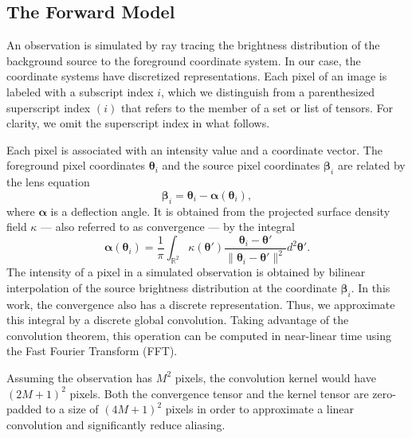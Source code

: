 \subsection{The Forward Model}\label{sec:forward model}

An observation is simulated by ray tracing the brightness distribution 
of the background source to the foreground coordinate system. 
In our case, the coordinate systems have discretized representations.
Each pixel of an image is labeled with a subscript index $i$, which 
we distinguish from a parenthesized superscript index $(i)$ that refers to 
the member of a set or list of tensors. For clarity, we omit 
the superscript index in what follows.

Each pixel is associated 
with an intensity value and a coordinate vector.
The foreground pixel coordinates $\boldsymbol{\theta}_i$ and the source 
pixel coordinates $\boldsymbol{\beta}_i$ are related by
the lens equation
\begin{equation}\label{eq:LensEquation}
        \bm{\beta}_i = \bm{\theta}_i - \bm{\alpha}(\bm{\theta}_i),
\end{equation}
where $\boldsymbol{\alpha}$ is a deflection angle.
It is obtained from the projected surface 
density field $\kappa$ --- also referred to as convergence --- by the integral
\begin{equation}\label{eq:alpha}
        \bm{\alpha}(\boldsymbol{\theta}_i) = 
        \frac{1}{\pi} \int_{\mathbb{R}^2}
        \kappa(\boldsymbol{\theta}') 
        \frac{\boldsymbol{\theta}_i
        - \boldsymbol{\theta}'}{\lVert \boldsymbol{\theta}_i - 
        \boldsymbol{\theta}' \rVert^2}
        d^2\boldsymbol{\theta}'.
\end{equation}
The intensity of a pixel in a simulated observation
is obtained by bilinear interpolation of the 
source brightness distribution at the coordinate $\boldsymbol{\beta}_i$.
In this work, the convergence also has a discrete representation. Thus, 
we approximate this integral by a discrete global convolution. Taking 
advantage of the convolution theorem, this operation 
can be computed in near-linear time using 
the Fast Fourier Transform (FFT). 

Assuming the observation 
has $M^2$ pixels, the convolution kernel %
would have $(2M + 1)^{2}$ pixels. 
Both the convergence tensor and the kernel tensor are zero-padded 
to a size of $(4M+1)^{2}$ pixels in order to approximate a linear 
convolution and significantly reduce aliasing.


